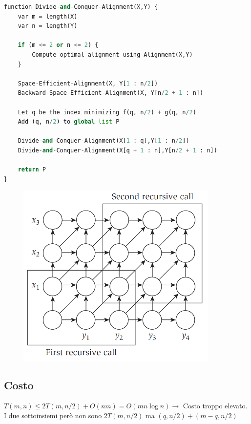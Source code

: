 \begin{lstlisting}[language=Python, mathescape=true]
function Divide-and-Conquer-Alignment(X,Y) {
    var m = length(X)
    var n = length(Y)

    if (m <= 2 or n <= 2) {
        Compute optimal alignment using Alignment(X,Y)
    }
    
    Space-Efficient-Alignment(X, Y[1 : n/2])
    Backward-Space-Efficient-Alignment(X, Y[n/2 + 1 : n])

    Let q be the index minimizing f(q, n/2) + g(q, n/2)
    Add (q, n/2) to global list P

    Divide-and-Conquer-Alignment(X[1 : q],Y[1 : n/2])
    Divide-and-Conquer-Alignment(X[q + 1 : n],Y[n/2 + 1 : n])
    
    return P
}
\end{lstlisting}

\begin{figure}[H]
\centering
  \includegraphics[width=10cm, keepaspectratio]{Programmazione_dinamica/imgs/seq_align_recurrence.png}
\end{figure}

\subsection{Costo}

$T(m,n) \le 2T(m, n/2) + O(nm) = O(mn \log n) \rightarrow$ Costo
troppo elevato.\\ I due sottoinsiemi però non sono $2T(m, n/2)$ ma
$(q, n/2) + (m-q, n/2)$

